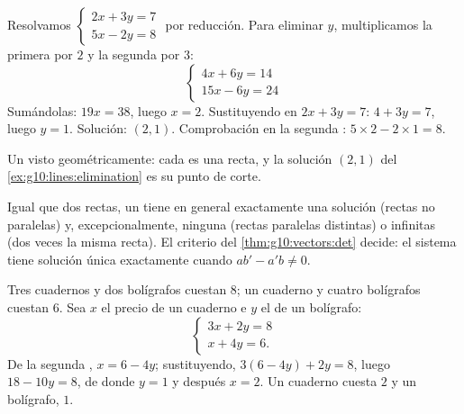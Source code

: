 \begin{example}\label{ex:g10:lines:elimination}
Resolvamos $\begin{cases} 2x + 3y = 7 \\ 5x - 2y = 8 \end{cases}$ por
reducción. Para eliminar $y$, multiplicamos la primera  por $2$ y
la segunda por $3$:
\[
\begin{cases}
4x + 6y = 14 \\
15x - 6y = 24
\end{cases}
\]
Sumándolas: $19x = 38$, luego $x = 2$. Sustituyendo en $2x + 3y = 7$:
$4 + 3y = 7$, luego $y = 1$. Solución: $(2, 1)$. Comprobación en la
segunda : $5 \times 2 - 2 \times 1 = 8$.
\end{example}

\begin{omfigure}

{\small Un  visto geométricamente: cada  es una
recta, y la solución $(2,1)$ del \cref{ex:g10:lines:elimination} es su
punto de corte.}
\end{omfigure}

\begin{remark}
Igual que dos rectas, un  tiene en general exactamente una
solución (rectas no paralelas) y, excepcionalmente, ninguna (rectas
paralelas distintas) o infinitas (dos veces la misma recta). El criterio
del \cref{thm:g10:vectors:det} decide: el sistema tiene solución única
exactamente cuando $ab' - a'b \neq 0$.
\end{remark}

\begin{example}\label{ex:g10:lines:modeling}
Tres cuadernos y dos bolígrafos cuestan $8$; un cuaderno y cuatro
bolígrafos cuestan $6$. Sea $x$ el precio de un cuaderno e $y$ el de un
bolígrafo:
\[
\begin{cases}
3x + 2y = 8 \\
x + 4y = 6 .
\end{cases}
\]
De la segunda , $x = 6 - 4y$; sustituyendo,
$3(6 - 4y) + 2y = 8$, luego $18 - 10y = 8$, de donde $y = 1$ y después
$x = 2$. Un cuaderno cuesta $2$ y un bolígrafo, $1$.
\end{example}

